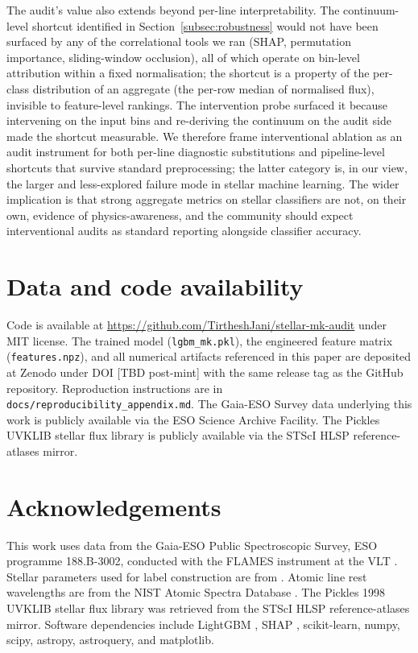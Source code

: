 \documentclass[11pt,a4paper]{article}
\begin{document}
The audit's value also extends beyond per-line interpretability. The continuum-level shortcut identified in Section~\ref{subsec:robustness} would not have been surfaced by any of the correlational tools we ran (SHAP, permutation importance, sliding-window occlusion), all of which operate on bin-level attribution within a fixed normalisation; the shortcut is a property of the per-class distribution of an aggregate (the per-row median of normalised flux), invisible to feature-level rankings. The intervention probe surfaced it because intervening on the input bins and re-deriving the continuum on the audit side made the shortcut measurable. We therefore frame interventional ablation as an audit instrument for both per-line diagnostic substitutions and pipeline-level shortcuts that survive standard preprocessing; the latter category is, in our view, the larger and less-explored failure mode in stellar machine learning. The wider implication is that strong aggregate metrics on stellar classifiers are not, on their own, evidence of physics-awareness, and the community should expect interventional audits as standard reporting alongside classifier accuracy.

\section*{Data and code availability}

Code is available at \url{https://github.com/TirtheshJani/stellar-mk-audit} under MIT license. The trained model (\texttt{lgbm\_mk.pkl}), the engineered feature matrix (\texttt{features.npz}), and all numerical artifacts referenced in this paper are deposited at Zenodo under DOI [TBD post-mint] with the same release tag as the GitHub repository. Reproduction instructions are in \texttt{docs/reproducibility\_appendix.md}. The Gaia-ESO Survey data underlying this work is publicly available via the ESO Science Archive Facility. The Pickles UVKLIB stellar flux library is publicly available via the STScI HLSP reference-atlases mirror.

\section*{Acknowledgements}

This work uses data from the Gaia-ESO Public Spectroscopic Survey, ESO programme 188.B-3002, conducted with the FLAMES instrument at the VLT \citep{2022A&A...666A.120G,2014A&A...565A.113S}. Stellar parameters used for label construction are from \citet{2023A&A...676A.129H}. Atomic line rest wavelengths are from the NIST Atomic Spectra Database \citep{NIST_ASD_2023}. The Pickles 1998 UVKLIB stellar flux library was retrieved from the STScI HLSP reference-atlases mirror. Software dependencies include LightGBM \citep{Ke2017LightGBM}, SHAP \citep{LundbergLee2017SHAP}, scikit-learn, numpy, scipy, astropy, astroquery, and matplotlib.
\end{document}
